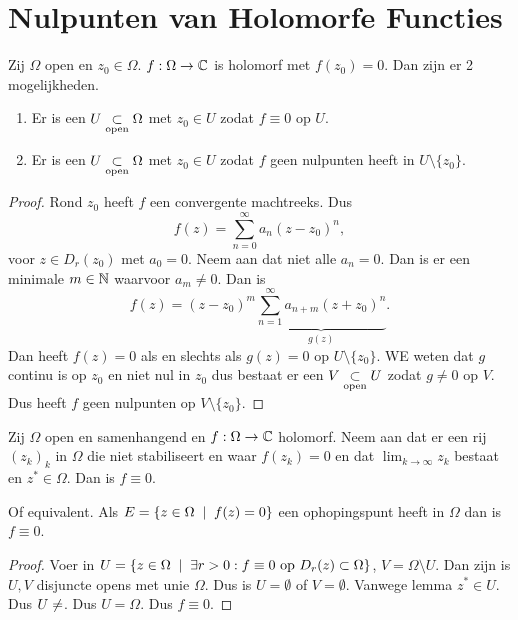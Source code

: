 
\chapter{Nulpunten van Holomorfe Functies} \label{chap:nulpunten_van_holomorfe_functies}

\begin{lemma}
	Zij $\Omega$ open en $z_0 \in \Omega$. 
	$f: \Omega \to \mathbb{C}$ is holomorf met $f(z_0) = 0$. 
	Dan zijn er 2 mogelijkheden.
	\begin{enumerate}
		\item Er is een $U \underset{\text{open}}{\subset} \Omega$ met $z_0 \in U$ zodat $f \equiv 0 $  op $U$.
		\item Er is een $U \underset{\text{open}}{\subset} \Omega$ met $z_0 \in U$ zodat $f$ geen nulpunten heeft in $U \setminus \{z_0\} $.
	\end{enumerate}
\end{lemma}
\begin{proof}
	Rond $z_0$ heeft $f$ een convergente machtreeks. Dus \[
		f(z) = \sum_{n = 0}^{\infty} a_n (z - z_0)^{n}
	,\] 
	voor $z \in D_r(z_0)$ met $a_0 = 0$.
	Neem aan dat niet alle $a_n = 0$. Dan is er een minimale $m \in \mathbb{N}$ waarvoor $a_m \ne 0$. 
	Dan is 
	\[
		f(z) = (z - z_0)^{m}\underbrace{\sum_{n=1}^{\infty} a_{n + m}(z  + z_0)^{n}}_{g(z)}
	.\] 
	Dan heeft $f(z) = 0$ als en slechts als $g(z) = 0$ op $U \setminus \{z_0\} $. WE weten dat  $g$ continu is op $z_0$ en niet nul in $z_0$ dus bestaat er een $V \underset{\text{open}}{\subset} U$ zodat $g \ne 0$ op $V$. Dus heeft $f$ geen nulpunten op $V \setminus \{z_0\} $.
\end{proof}

\begin{stelling}
	Zij $\Omega$ open en samenhangend en $f: \Omega \to \mathbb{C}$ holomorf. 
	Neem aan dat er een rij  $(z_k)_k$ in $\Omega$ die niet stabiliseert en waar $f(z_k) = 0$ en dat $\lim_{k \to \infty}z_k$ bestaat en $z^* \in \Omega$. 
	Dan is $f\equiv 0$. 

	Of equivalent. Als $E = \{z \in \Omega \st f(z) = 0\} $ een ophopingspunt heeft in $\Omega$ dan is $f \equiv 0$.
\end{stelling}
\begin{proof}
	Voer in $U = \{z \in \Omega \st \exists r> 0 : f\equiv 0 \text{ op } D_r(z) \subset  \Omega\} $, $V = \Omega \setminus U$.  	
	Dan zijn is $U, V$ disjuncte opens met unie $\Omega$. 
	Dus is $U = \emptyset$ of $V = \emptyset $. 
	Vanwege lemma $z^{*} \in U$. Dus $U \ne \empty$. Dus $U = \Omega$. Dus $f \equiv 0$.
\end{proof}

